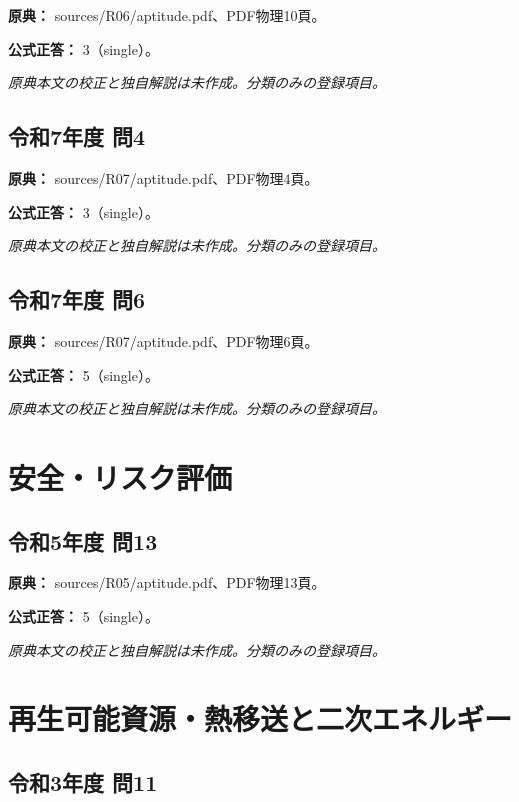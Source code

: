 \noindent\textbf{原典：} sources/R06/aptitude.pdf、PDF物理10頁。

\textbf{公式正答：} 3（single）。

\par\textit{原典本文の校正と独自解説は未作成。分類のみの登録項目。}

\subsection{令和7年度 問4}
\label{q:r07-reg-apt-04}

\noindent\textbf{原典：} sources/R07/aptitude.pdf、PDF物理4頁。

\textbf{公式正答：} 3（single）。

\par\textit{原典本文の校正と独自解説は未作成。分類のみの登録項目。}

\subsection{令和7年度 問6}
\label{q:r07-reg-apt-06}

\noindent\textbf{原典：} sources/R07/aptitude.pdf、PDF物理6頁。

\textbf{公式正答：} 5（single）。

\par\textit{原典本文の校正と独自解説は未作成。分類のみの登録項目。}

\section{安全・リスク評価}

\subsection{令和5年度 問13}
\label{q:r05-reg-apt-13}

\noindent\textbf{原典：} sources/R05/aptitude.pdf、PDF物理13頁。

\textbf{公式正答：} 5（single）。

\par\textit{原典本文の校正と独自解説は未作成。分類のみの登録項目。}

\section{再生可能資源・熱移送と二次エネルギー}

\subsection{令和3年度 問11}
\label{q:r03-reg-apt-11}

